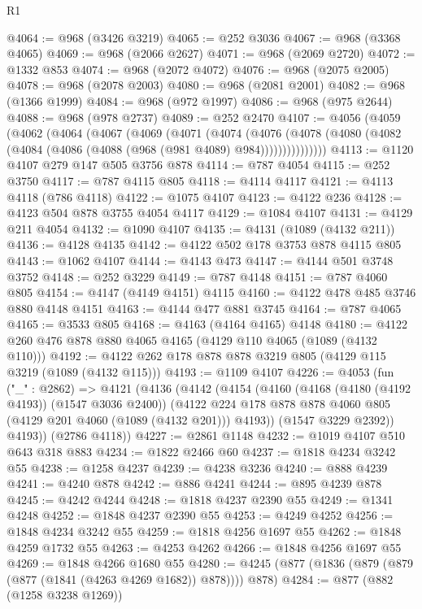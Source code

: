 \begin{lexlean}{R1}
\begin{coremodule}
@4064 := @968 (@3426 @3219)
@4065 := @252 @3036
@4067 := @968 (@3368 @4065)
@4069 := @968 (@2066 @2627)
@4071 := @968 (@2069 @2720)
@4072 := @1332 @853
@4074 := @968 (@2072 @4072)
@4076 := @968 (@2075 @2005)
@4078 := @968 (@2078 @2003)
@4080 := @968 (@2081 @2001)
@4082 := @968 (@1366 @1999)
@4084 := @968 (@972 @1997)
@4086 := @968 (@975 @2644)
@4088 := @968 (@978 @2737)
@4089 := @252 @2470
@4107 := @4056
    (@4059
      (@4062
        (@4064
          (@4067
            (@4069
              (@4071
                (@4074
                  (@4076
                    (@4078 (@4080 (@4082 (@4084 (@4086 (@4088 (@968 (@981 @4089) @984)))))))))))))))
@4113 := @1120 @4107 @279 @147 @505 @3756 @878
@4114 := @787 @4054
@4115 := @252 @3750
@4117 := @787 @4115 @805
@4118 := @4114 @4117
@4121 := @4113 @4118 (@786 @4118)
@4122 := @1075 @4107
@4123 := @4122 @236
@4128 := @4123 @504 @878 @3755 @4054 @4117
@4129 := @1084 @4107
@4131 := @4129 @211 @4054
@4132 := @1090 @4107
@4135 := @4131 (@1089 (@4132 @211))
@4136 := @4128 @4135
@4142 := @4122 @502 @178 @3753 @878 @4115 @805
@4143 := @1062 @4107
@4144 := @4143 @473
@4147 := @4144 @501 @3748 @3752
@4148 := @252 @3229
@4149 := @787 @4148
@4151 := @787 @4060 @805
@4154 := @4147 (@4149 @4151) @4115
@4160 := @4122 @478 @485 @3746 @880 @4148 @4151
@4163 := @4144 @477 @881 @3745
@4164 := @787 @4065
@4165 := @3533 @805
@4168 := @4163 (@4164 @4165) @4148
@4180 := @4122 @260 @476 @878 @880 @4065 @4165 (@4129 @110 @4065 (@1089 (@4132 @110)))
@4192 := @4122 @262 @178 @878 @878 @3219 @805 (@4129 @115 @3219 (@1089 (@4132 @115)))
@4193 := @1109 @4107
@4226 := @4053
    (fun ("_" : @2862) =>
    @4121
      (@4136
        (@4142
          (@4154
            (@4160
              (@4168 (@4180 (@4192 @4193)) (@1547 @3036 @2400))
              (@4122 @224 @178 @878 @878 @4060 @805 (@4129 @201 @4060 (@1089 (@4132 @201))) @4193))
            (@1547 @3229 @2392))
          @4193))
      (@2786 @4118))
@4227 := @2861 @1148
@4232 := @1019 @4107 @510 @643 @318 @883
@4234 := @1822 @2466 @60
@4237 := @1818 @4234 @3242 @55
@4238 := @1258 @4237
@4239 := @4238 @3236
@4240 := @888 @4239
@4241 := @4240 @878
@4242 := @886 @4241
@4244 := @895 @4239 @878
@4245 := @4242 @4244
@4248 := @1818 @4237 @2390 @55
@4249 := @1341 @4248
@4252 := @1848 @4237 @2390 @55
@4253 := @4249 @4252
@4256 := @1848 @4234 @3242 @55
@4259 := @1818 @4256 @1697 @55
@4262 := @1848 @4259 @1732 @55
@4263 := @4253 @4262
@4266 := @1848 @4256 @1697 @55
@4269 := @1848 @4266 @1680 @55
@4280 := @4245 (@877 (@1836 (@879 (@879 (@877 (@1841 (@4263 @4269 @1682)) @878)))) @878)
@4284 := @877 (@882 (@1258 @3238 @1269))

\end{coremodule}
\end{lexlean}
